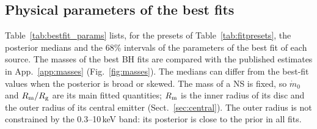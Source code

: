 \subsection{Physical parameters of the best fits}
\label{sec:results:params}

Table~\ref{tab:bestfit_params} lists, for the presets of Table~\ref{tab:fitpresets}, the posterior medians and the 68\% intervals of the parameters of the best fit of each source.
The masses of the best BH fits are compared with the published estimates in App.~\ref{app:masses} (Fig.~\ref{fig:masses}).
The medians can differ from the best-fit values when the posterior is broad or skewed.
The mass of a NS is fixed, so $\dot m_0$ and $R_{\rm m}/R_{\rm g}$ are its main fitted quantities; $R_{\rm m}$ is the inner radius of its disc and the outer radius of its central emitter (Sect.~\ref{sec:central}).
The outer radius is not constrained by the 0.3--10\,keV band: its posterior is close to the prior in all fits.

